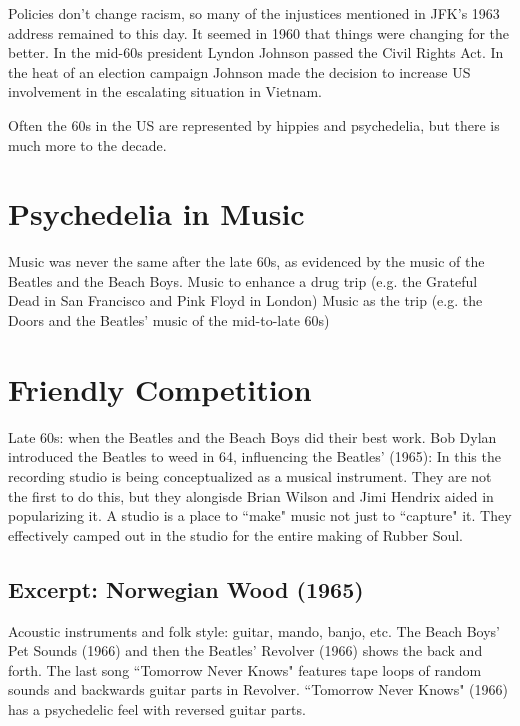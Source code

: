 \documentclass[12pt, a4paper, twoside, openright, titlepage]{book}
\begin{document}
Policies don't change racism, so many of the injustices mentioned in JFK's 1963 address remained to this day. It seemed in 1960 that things were changing for the better. In the mid-60s president Lyndon Johnson passed the Civil Rights Act. In the heat of an election campaign Johnson made the decision to increase US involvement in the escalating situation in Vietnam. 

Often the 60s in the US are represented by hippies and psychedelia, but there is much more to the decade.

\section{Psychedelia in Music}

Music was never the same after the late 60s, as evidenced by the music of the Beatles and the Beach Boys. Music to enhance a drug trip (e.g. the Grateful Dead in San Francisco and Pink Floyd in London) Music as the trip (e.g. the Doors and the Beatles' music of the mid-to-late 60s)


\section{Friendly Competition}

Late 60s: when the Beatles and the Beach Boys did their best work. Bob Dylan introduced the Beatles to weed in 64, influencing the Beatles'  (1965): In this the recording studio is being conceptualized as a musical instrument. They are not the first to do this, but they alongisde Brian Wilson and Jimi Hendrix aided in popularizing it. A studio is a place to ``make" music not just to ``capture" it. They effectively camped out in the studio for the entire making of Rubber Soul.

\subsection{Excerpt: Norwegian Wood (1965)}

Acoustic instruments and folk style: guitar, mando, banjo, etc. The Beach Boys' Pet Sounds (1966) and then the Beatles' Revolver (1966) shows the back and forth. The last song ``Tomorrow Never Knows" features tape loops of random sounds and backwards guitar parts in Revolver. ``Tomorrow Never Knows" (1966) has a psychedelic feel with reversed guitar parts.
\end{document}
